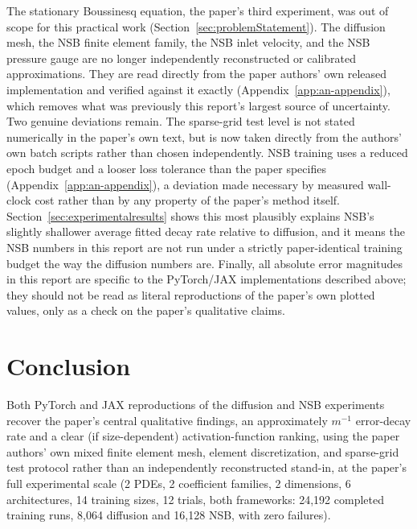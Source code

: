 The stationary Boussinesq equation, the paper's third experiment, was out
of scope for this practical work (Section~\ref{sec:problemStatement}). The
diffusion mesh, the NSB finite element family, the NSB inlet velocity, and
the NSB pressure gauge are no longer independently reconstructed or
calibrated approximations. They are read directly from the paper authors'
own released implementation and verified against it exactly
(Appendix~\ref{app:an-appendix}), which removes what was previously this
report's largest source of uncertainty. Two genuine deviations remain. The
sparse-grid test level is not stated numerically in the paper's own text,
but is now taken directly from the authors' own batch scripts rather than
chosen independently. NSB training uses a reduced epoch budget and a
looser loss tolerance than the paper specifies
(Appendix~\ref{app:an-appendix}), a deviation made necessary by measured
wall-clock cost rather than by any property of the paper's method itself.
Section~\ref{sec:experimentalresults} shows this most plausibly explains
NSB's slightly shallower average fitted decay rate relative to diffusion,
and it means the NSB numbers in this report are not run under a strictly
paper-identical training budget the way the diffusion numbers are.
Finally, all absolute error magnitudes in this report are specific to the
PyTorch/JAX implementations described above; they should not be read as
literal reproductions of the paper's own plotted values, only as a check
on the paper's qualitative claims.

\section{Conclusion}

Both PyTorch and JAX reproductions of the diffusion and NSB experiments
recover the paper's central qualitative findings, an approximately
$m^{-1}$ error-decay rate and a clear (if size-dependent)
activation-function ranking, using the paper authors' own mixed finite
element mesh, element discretization, and sparse-grid test protocol
rather than an independently reconstructed stand-in, at the paper's full
experimental scale (2 PDEs, 2 coefficient families, 2 dimensions, 6
architectures, 14 training sizes, 12 trials, both frameworks: 24,192
completed training runs, 8,064 diffusion and 16,128 NSB, with zero
failures).

